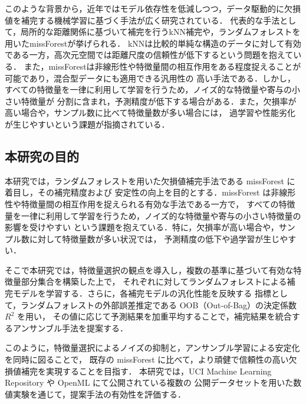 このような背景から，近年ではモデル依存性を低減しつつ，データ駆動的に欠損値を補完する機械学習に基づく手法が広く研究されている．
代表的な手法として，局所的な距離関係に基づいて補完を行うkNN補完や，ランダムフォレストを用いたmissForestが挙げられる．
kNNは比較的単純な構造のデータに対して有効である一方，高次元空間では距離尺度の信頼性が低下するという問題を抱えている．
また，missForestは非線形性や特徴量間の相互作用をある程度捉えることが可能であり，混合型データにも適用できる汎用性の
高い手法である．しかし，すべての特徴量を一律に利用して学習を行うため，ノイズ的な特徴量や寄与の小さい特徴量が
分割に含まれ，予測精度が低下する場合がある．また，欠損率が高い場合や，サンプル数に比べて特徴量数が多い場合には，
過学習や性能劣化が生じやすいという課題が指摘されている．

\subsection{本研究の目的}
本研究では，ランダムフォレストを用いた欠損値補完手法である missForest に着目し，その補完精度および
安定性の向上を目的とする．missForest は非線形性や特徴量間の相互作用を捉えられる有効な手法である一方で，
すべての特徴量を一律に利用して学習を行うため，ノイズ的な特徴量や寄与の小さい特徴量の影響を受けやすい
という課題を抱えている．特に，欠損率が高い場合や，サンプル数に対して特徴量数が多い状況では，
予測精度の低下や過学習が生じやすい．

そこで本研究では，特徴量選択の観点を導入し，複数の基準に基づいて有効な特徴量部分集合を構築した上で，
それぞれに対してランダムフォレストによる補完モデルを学習する．さらに，各補完モデルの汎化性能を反映する
指標として，ランダムフォレストの外部誤差推定である OOB（Out-of-Bag）の決定係数 $R^2$ を用い，
その値に応じて予測結果を加重平均することで，補完結果を統合するアンサンブル手法を提案する．

このように，特徴量選択によるノイズの抑制と，アンサンブル学習による安定化を同時に図ることで，
既存の missForest に比べて，より頑健で信頼性の高い欠損値補完を実現することを目指す．
本研究では，UCI Machine Learning Repository や OpenML にて公開されている複数の
公開データセットを用いた数値実験を通じて，提案手法の有効性を評価する．